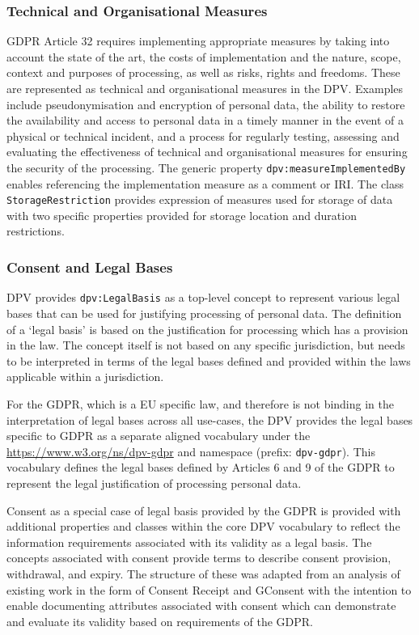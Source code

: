 \subsubsection{Technical and Organisational Measures}
GDPR Article 32 requires implementing appropriate measures by taking into account the state of the art, the costs of implementation and the nature, scope, context and purposes of processing, as well as risks, rights and freedoms.
These are represented as technical and organisational measures in the DPV.
Examples include pseudonymisation and encryption of personal data, the ability to restore the availability and access to personal data in a timely manner in the event of a physical or technical incident, and a process for regularly testing, assessing and evaluating the effectiveness of technical and organisational measures for ensuring the security of the processing.
The generic property \texttt{dpv:measureImplementedBy} enables referencing the implementation measure as a comment or IRI.
The class \texttt{StorageRestriction} provides expression of measures used for storage of data with two specific properties provided for storage location and duration restrictions.

\subsubsection{Consent and Legal Bases}
DPV provides \texttt{dpv:LegalBasis} as a top-level concept to represent various legal bases that can be used for justifying processing of personal data.
The definition of a `legal basis' is based on the justification for processing which has a provision in the law. The concept itself is not based on any specific jurisdiction, but needs to be interpreted in terms of the legal bases defined and provided within the laws applicable within a jurisdiction.

For the GDPR, which is a EU specific law, and therefore is not binding in the interpretation of legal bases across all use-cases, the DPV provides the legal bases specific to GDPR as a separate aligned vocabulary under the \url{https://www.w3.org/ns/dpv-gdpr} and namespace (prefix: \texttt{dpv-gdpr}). 
This vocabulary defines the legal bases defined by Articles 6 and 9 of the GDPR to represent the legal justification of processing personal data.

Consent as a special case of legal basis provided by the GDPR is provided with additional properties and classes within the core DPV vocabulary to reflect the information requirements associated with its validity as a legal basis.
The concepts associated with consent provide terms to describe consent provision, withdrawal, and expiry.
The structure of these was adapted from an analysis of existing work in the form of Consent Receipt \cite{lizar_consent_2017} and GConsent \cite{pandit_gconsent_2019} with the intention to enable documenting attributes associated with consent which can demonstrate and evaluate its validity based on requirements of the GDPR.

